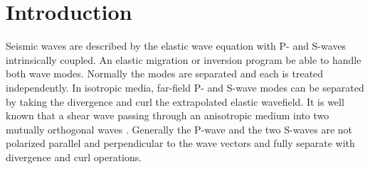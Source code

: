\section{Introduction}

Seismic waves are described by the elastic wave equation with P- and S-waves intrinsically coupled. An elastic migration or inversion
program  be able to handle both wave modes. Normally the  modes are separated and each is treated independently.
In isotropic media, far-field P- and S-wave modes can be separated by taking the divergence and curl  the extrapolated elastic wavefield.
It is well known that a shear wave passing through an anisotropic medium  into two mutually orthogonal waves \cite[]{crampin:1984}.
Generally the P-wave and the two S-waves  are not polarized parallel and perpendicular to the wave vectors
 and  fully separate with divergence and curl operations.

